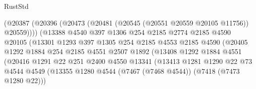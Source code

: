 \begin{lexlean}{RustStd}
\begin{coremodule}
                                  (@20387
                                    (@20396
                                      (@20473
                                        (@20481 (@20545 (@20551 @20559 @20105 @11756)) @20559))))
                                  (@13388
                                    @4540
                                    @397
                                    @1306
                                    @254
                                    @2185
                                    @2774
                                    @2185
                                    @4590
                                    @20105
                                    (@13301
                                      @1293
                                      @397
                                      @1305
                                      @254
                                      @2185
                                      @4553
                                      @2185
                                      @4590
                                      (@20405
                                        @1292
                                        @1884
                                        @254
                                        @2185
                                        @4551
                                        @2507
                                        @1892
                                        (@13408
                                          @1292
                                          @1884
                                          @4551
                                          (@20416
                                            @1291
                                            @22
                                            @251
                                            @2400
                                            @4550
                                            @13341
                                            (@13413
                                              @1281
                                              @1290
                                              @22
                                              @73
                                              @4544
                                              @4549
                                              (@13355
                                                @1280
                                                @4544
                                                (@7467 (@7468 @4544))
                                                (@7418 (@7473 @1280 @22)))

\end{coremodule}
\end{lexlean}
